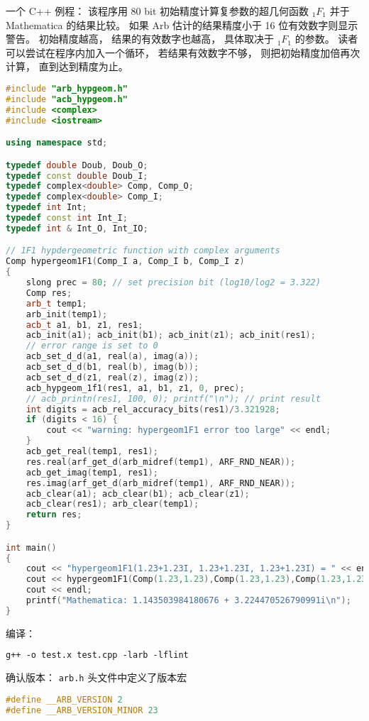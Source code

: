 一个 C++ 例程： 该程序用 80 bit 初始精度计算复参数的超几何函数 $_1F_1$ 并于 Mathematica 的结果比较。 如果 Arb 估计的结果精度小于 16 位有效数字则显示警告。 初始精度越高， 结果的有效数字也越高， 具体取决于 $_1F_1$ 的参数。 读者可以尝试在程序内加入一个循环， 若结果有效数字不够， 则把初始精度加倍再次计算， 直到达到精度为止。

\begin{lstlisting}[language=cpp, caption=test.cpp]
#include "arb_hypgeom.h"
#include "acb_hypgeom.h"
#include <complex>
#include <iostream>

using namespace std;

typedef double Doub, Doub_O;
typedef const double Doub_I;
typedef complex<double> Comp, Comp_O;
typedef complex<double> Comp_I;
typedef int Int;
typedef const int Int_I;
typedef int & Int_O, Int_IO;

// 1F1 hypdergeometric function with complex arguments
Comp hypergeom1F1(Comp_I a, Comp_I b, Comp_I z)
{
	slong prec = 80; // set precision bit (log10/log2 = 3.322)
	Comp res;
	arb_t temp1;
	arb_init(temp1);
	acb_t a1, b1, z1, res1;
	acb_init(a1); acb_init(b1); acb_init(z1); acb_init(res1);
	// error range is set to 0
	acb_set_d_d(a1, real(a), imag(a));
	acb_set_d_d(b1, real(b), imag(b));
	acb_set_d_d(z1, real(z), imag(z));
	acb_hypgeom_1f1(res1, a1, b1, z1, 0, prec);
	// acb_printn(res1, 100, 0); printf("\n"); // print result
	int digits = acb_rel_accuracy_bits(res1)/3.321928;
	if (digits < 16) {
		cout << "warning: hypergeom1F1 error too large" << endl;
	}
	acb_get_real(temp1, res1);
	res.real(arf_get_d(arb_midref(temp1), ARF_RND_NEAR));
	acb_get_imag(temp1, res1);
	res.imag(arf_get_d(arb_midref(temp1), ARF_RND_NEAR));
	acb_clear(a1); acb_clear(b1); acb_clear(z1);
    acb_clear(res1); arb_clear(temp1);
	return res;
}

int main()
{
	cout << "hypergeom1F1(1.23+1.23I, 1.23+1.23I, 1.23+1.23I) = " << endl;
	cout << hypergeom1F1(Comp(1.23,1.23),Comp(1.23,1.23),Comp(1.23,1.23))
    cout << endl;
	printf("Mathematica: 1.143503984180676 + 3.224470526790991i\n");
}
\end{lstlisting}
编译：
\begin{lstlisting}[language=makefile]
g++ -o test.x test.cpp -larb -lflint
\end{lstlisting}

确认版本： \verb|arb.h| 头文件中定义了版本宏
\begin{lstlisting}[language=cpp]
#define __ARB_VERSION 2
#define __ARB_VERSION_MINOR 23
\end{lstlisting}

